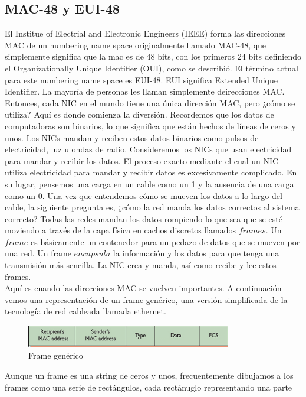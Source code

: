 \documentclass[12pt]{report}
\begin{document}
\subsection{MAC-48 y EUI-48}
El Institue of Electrial and Electronic Engineers (IEEE) forma las direcciones 
MAC de un numbering name space originalmente llamado MAC-48, que simplemente 
significa que la mac es de 48 bits, con los primeros 24 bits definiendo 
el Organizationally Unique Identifier (OUI), como se describió.
El término actual para este numbering name space es EUI-48. 
EUI significa Extended Unique Identifier.
La mayoría de personas les llaman simplemente deirecciones MAC.
Entonces, cada NIC en el mundo tiene una única dirección MAC, pero ¿cómo se utiliza?
Aquí es donde comienza la diversión. Recordemos que los datos de computadoras
son binarios, lo que significa que están hechos de líneas de ceros y unos.
Los NICs mandan y reciben estos datos binarios como pulsos de electricidad, luz u
ondas de radio. Consideremos los NICs que usan electricidad para mandar y recibir
los datos. El proceso exacto mediante el cual un NIC utiliza electricidad
para mandar y recibir datos es excesivamente complicado. En su lugar, 
pensemos una carga en un cable como un 1 y la ausencia de una carga como un 0.
Una vez que entendemos cómo se mueven los datos a lo largo del cable, la siguiente
pregunta es, ¿cómo la red manda los datos correctos al sistema correcto?
Todas las redes mandan los datos rompiendo lo que sea que se esté moviendo
a través de la capa física en cachos discretos llamados $\textit{frames}$.
Un $\textit{frame}$ es básicamente un contenedor para un pedazo de datos que se 
mueven por una red. Un frame $\textit{encapsula}$ la información y los datos
para que tenga una transmisión más sencilla. La NIC crea y manda, así como
recibe y lee estos frames.\\
Aquí es cuando las direcciones MAC se vuelven importantes. A continuación vemos 
una representación de un frame genérico, una versión simplificada 
de la tecnología de red cableada llamada ethernet.
\begin{figure}[h]
  \centering
  \includegraphics[width=0.8\textwidth]{Frame.png}
  \caption{Frame genérico}
  \label{fig:image}
\end{figure}
Aunque un frame es una string de ceros y unos, frecuentemente dibujamos a los
frames como una serie de rectángulos, cada rectánuglo representando una parte
\end{document}
